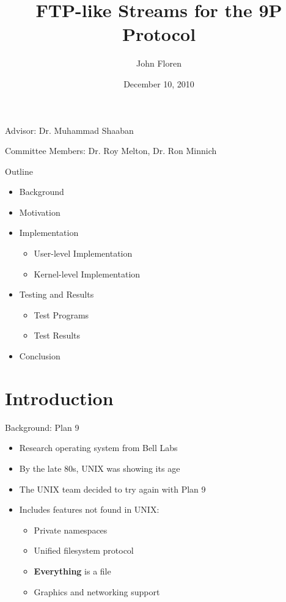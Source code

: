 \documentclass[11pt,compress]{beamer}
\title[Streaming 9P]{FTP-like Streams for the 9P Protocol}
\author{John Floren}
\institute{Rochester Institute of Technology}
\date{December 10, 2010}
\begin{document}
\begin{frame}
\titlepage
\begin{center}
\scriptsize Advisor: Dr. Muhammad Shaaban

\scriptsize Committee Members: Dr. Roy Melton, Dr. Ron Minnich
\end{center}
\end{frame}

\begin{frame}{Outline}
\begin{itemize}
	\item Background
	\item Motivation
	\item Implementation
	\begin{itemize}
		\item User-level Implementation
		\item Kernel-level Implementation
	\end{itemize}
	\item Testing and Results
	\begin{itemize}
		\item Test Programs
		\item Test Results
	\end{itemize}
	\item Conclusion
\end{itemize}
\end{frame}

\section{Introduction}
\begin{frame}{Background: Plan 9}
\begin{itemize}
	\item Research operating system from Bell Labs
	\item By the late 80s, UNIX was showing its age
	\item The UNIX team decided to try again with Plan 9
	\item Includes features not found in UNIX:
	\begin{itemize}
		\item Private namespaces
		\item Unified filesystem protocol\cite{5intro}
		\item {\bf Everything} is a file
		\item Graphics and networking support
	\end{itemize}
\end{itemize}
\end{frame}
\end{document}
